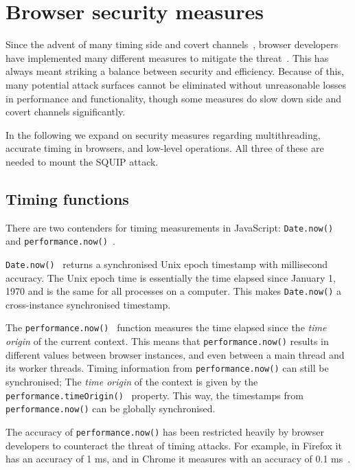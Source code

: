 \documentclass[11pt,
  titlepage=false,
  parskip=half,      %
]{scrreprt}
\begin{document}
\section{Browser security measures}
\label{sec:browsersecurity}
Since the advent of many timing side and covert channels~\cite{noack2018exploiting, Rokicki2022webport, gruss2016rowhammer, 185126},
browser developers have implemented many different measures to mitigate the threat~\cite{shusterman2021prime, performancenow, performancenowchrome, schwarz2018javascript}.
This has always meant striking a balance between security and efficiency.
Because of this, many potential attack surfaces cannot be eliminated without unreasonable losses in performance and functionality,
though some measures do slow down side and covert channels significantly.

In the following we expand on security measures regarding multithreading, accurate timing in browsers, and low-level operations.
All three of these are needed to mount the SQUIP attack.


\subsection{Timing functions}\label{subsec:timingjs}
There are two contenders for timing measurements in JavaScript: \texttt{Date.now()}~\cite{datenow} and \texttt{performance.now()}~\cite{performancenow}.

\texttt{Date.now()}~\cite{datenow} returns a synchronised Unix epoch timestamp with millisecond accuracy.
The Unix epoch time is essentially the time elapsed since January 1, 1970 and is the same for all processes on a computer.
This makes \texttt{Date.now()} a cross-instance synchronised timestamp.

The \texttt{performance.now()}~\cite{performancenow} function measures the time elapsed since the \textit{time origin} of the current context.
This means that \texttt{performance.now()} results in different values between browser instances, and even between a main thread and its worker threads.
Timing information from \texttt{performance.now()} can still be synchronised;
The \textit{time origin} of the context is given by the \texttt{performance.timeOrigin()}~\cite{performancetimeorigin} property.
This way, the timestamps from \texttt{performance.now()} can be globally synchronised.

The accuracy of \texttt{performance.now()} has been restricted heavily by browser developers to counteract the threat of timing attacks.
For example, in Firefox it has an accuracy of 1 ms, and in Chrome it measures with an accuracy of 0.1 ms~\cite{performancenow, performancenowchrome}.
\end{document}

